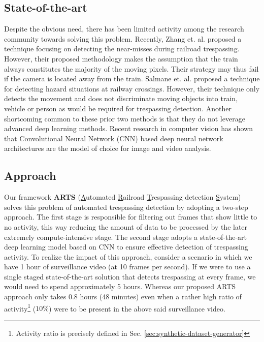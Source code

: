 \subsection{State-of-the-art}
Despite the obvious need, there has been limited activity among the research community towards solving this problem. Recently, Zhang et. al. \cite{zhang2018automated} proposed a technique focusing on detecting the near-misses during railroad trespassing. However, their proposed methodology makes the assumption that the train always constitutes the majority of the moving pixels. Their strategy may thus fail if the camera is located away from the train. Salmane et. al. \cite{salmane2015video} proposed a technique for detecting hazard situations at railway crossings. However, their technique only detects the movement and does not discriminate moving objects into train, vehicle or person as would be required for trespassing detection. Another shortcoming common to these prior two methods is that they do not leverage advanced deep learning methods. Recent research in computer vision has shown that Convolutional Neural Network (CNN) based deep neural network architectures are the model of choice for image and video analysis\cite{krizhevsky2012imagenet}. 

\subsection{Approach}
Our framework \textbf{ARTS} (\underline{A}utomated \underline{R}ailroad \underline{T}respassing detection \underline{S}ystem) solves this problem of automated trespassing detection by adopting a two-step approach. The first stage is responsible for filtering out frames that show little to no activity, this way reducing the amount of data to be processed by the later extremely compute-intensive stage. The second stage adopts a state-of-the-art deep learning model based on CNN to ensure effective detection of trespassing activity. To realize the impact of this approach, consider a scenario in which we have 1 hour of surveillance video (at 10 frames per second). If we were to use a single staged state-of-the-art solution that detects trespassing at every frame, we would need to spend approximately 5 hours. Whereas our proposed ARTS approach only takes 0.8 hours (48 minutes) even when a rather high ratio of activity\footnote{Activity ratio is precisely defined in Sec. \ref{sec:synthetic-dataset-generator}} ($10\%$) were to be present in the above said surveillance video.

